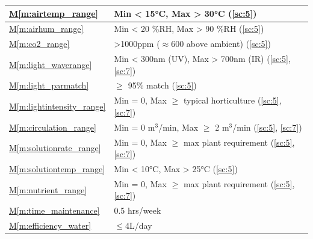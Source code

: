 \documentclass{../tex/report}
\newcommand{\mref}[1]{\hyperref[#1]{M\ref{#1}}}
\begin{document}
\begin{tabular}{|l|p{14.35cm}|}
    \mref{m:airtemp_range}              & Min < 15°C, Max > 30°C                                            \hfill (\ref{sc:5})                                     \\ \hline %
    \mref{m:airhum_range}               & Min < 20 \%RH, Max > 90 \%RH                                      \hfill (\ref{sc:5})                                     \\ \hline %
    \mref{m:co2_range}                  & >1000ppm ($\approx$600 above ambient)                             \hfill (\ref{sc:5})                                     \\ \hline
    \mref{m:light_waverange}            & Min < 300nm (UV), Max > 700nm (IR)                                \hfill (\ref{sc:5}, \ref{sc:7}) \cite{uvc-disinfection} \\ \hline %
    \mref{m:light_parmatch}             & $\ge$ 95\% match                                                  \hfill (\ref{sc:5})                                     \\ \hline %
    \mref{m:lightintensity_range}       & Min = 0, Max $\ge$ typical horticulture                           \hfill (\ref{sc:5}, \ref{sc:7})                         \\ \hline %
    \mref{m:circulation_range}          & Min = 0 m${}^3$/min, Max $\ge$ 2 m${}^3$/min                      \hfill (\ref{sc:5}, \ref{sc:7})                         \\ \hline
    \mref{m:solutionrate_range}         & Min = 0, Max $\ge$ max plant requirement                          \hfill (\ref{sc:5}, \ref{sc:7})                         \\ \hline %
    \mref{m:solutiontemp_range}         & Min < 10°C, Max > 25°C                                            \hfill (\ref{sc:5})                                     \\ \hline %
    \mref{m:nutrient_range}             & Min = 0, Max $\ge$ max plant requirement                          \hfill (\ref{sc:5}, \ref{sc:7})                         \\ \hline %
    \mref{m:time_maintenance}           & 0.5 hrs/week                                                      \hfill \cite{dsfc-phase2}                               \\ \hline
    \mref{m:efficiency_water}           & $\le$4L/day                                                       \hfill \cite{dsfc-phase2}                               \\ \hline

\end{tabular}
\end{document}
